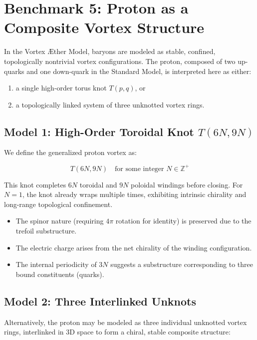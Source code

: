 \section{Benchmark 5: Proton as a Composite Vortex Structure}

In the Vortex Æther Model, baryons are modeled as stable, confined, topologically nontrivial vortex configurations. The proton, composed of two up-quarks and one down-quark in the Standard Model, is interpreted here as either:

\begin{enumerate}
    \item a single high-order torus knot \( T(p, q) \), or
    \item a topologically linked system of three unknotted vortex rings.
\end{enumerate}

\subsection{Model 1: High-Order Toroidal Knot \( T(6N, 9N) \)}

We define the generalized proton vortex as:

\begin{equation}
T(6N, 9N) \quad \text{for some integer } N \in \mathbb{Z}^+
\end{equation}

This knot completes \(6N\) toroidal and \(9N\) poloidal windings before closing. For \(N = 1\), the knot already wraps multiple times, exhibiting intrinsic chirality and long-range topological confinement.

\begin{itemize}
    \item The spinor nature (requiring \(4\pi\) rotation for identity) is preserved due to the trefoil substructure.
    \item The electric charge arises from the net chirality of the winding configuration.
    \item The internal periodicity of \(3N\) suggests a substructure corresponding to three bound constituents (quarks).
\end{itemize}

\subsection{Model 2: Three Interlinked Unknots}

Alternatively, the proton may be modeled as three individual unknotted vortex rings, interlinked in 3D space to form a chiral, stable composite structure:

